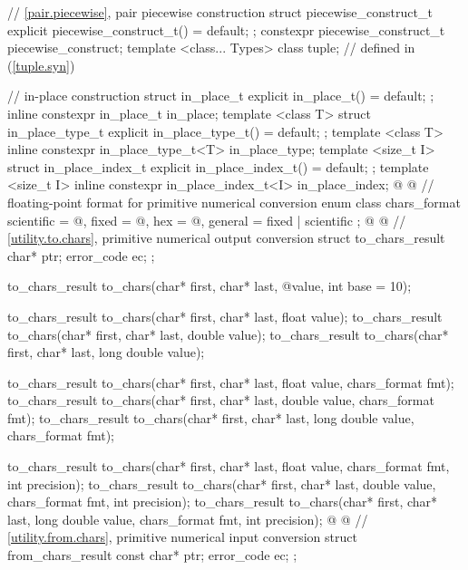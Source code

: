 \begin{codeblock}
{  // \ref{pair.piecewise}, pair piecewise construction
  struct piecewise_construct_t {
    explicit piecewise_construct_t() = default;
  };
  constexpr piecewise_construct_t piecewise_construct{};
  template <class... Types> class tuple;        // defined in  (\ref{tuple.syn})

  // in-place construction
  struct in_place_t {
    explicit in_place_t() = default;
  };
  inline constexpr in_place_t in_place{};
  template <class T>
    struct in_place_type_t {
      explicit in_place_type_t() = default;
    };
  template <class T> inline constexpr in_place_type_t<T> in_place_type{};
  template <size_t I>
    struct in_place_index_t {
      explicit in_place_index_t() = default;
    };
  template <size_t I> inline constexpr in_place_index_t<I> in_place_index{};
@
%
%
%
%
%
@
  // floating-point format for primitive numerical conversion
  enum class chars_format {
    scientific = @\unspec@,
    fixed = @\unspec@,
    hex = @\unspec@,
    general = fixed | scientific
  };
@
%
%
@
  // \ref{utility.to.chars}, primitive numerical output conversion
  struct to_chars_result {
    char* ptr;
    error_code ec;
  };

  to_chars_result to_chars(char* first, char* last, @\seebelow@ value, int base = 10);

  to_chars_result to_chars(char* first, char* last, float value);
  to_chars_result to_chars(char* first, char* last, double value);
  to_chars_result to_chars(char* first, char* last, long double value);

  to_chars_result to_chars(char* first, char* last, float value,
                           chars_format fmt);
  to_chars_result to_chars(char* first, char* last, double value,
                           chars_format fmt);
  to_chars_result to_chars(char* first, char* last, long double value,
                           chars_format fmt);

  to_chars_result to_chars(char* first, char* last, float value,
                           chars_format fmt, int precision);
  to_chars_result to_chars(char* first, char* last, double value,
                           chars_format fmt, int precision);
  to_chars_result to_chars(char* first, char* last, long double value,
                           chars_format fmt, int precision);
@
%
%
@
  // \ref{utility.from.chars}, primitive numerical input conversion
  struct from_chars_result {
    const char* ptr;
    error_code ec;
  };

}
\end{codeblock}
